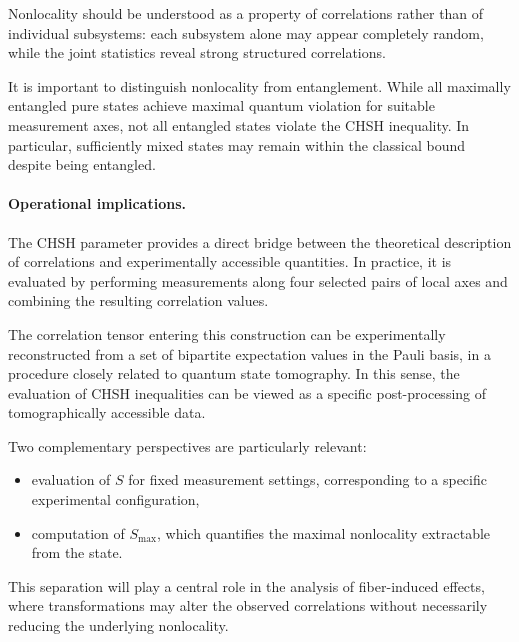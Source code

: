 \medskip

Nonlocality should be understood as a property of correlations rather than of individual subsystems: each subsystem alone may appear completely random, while the joint statistics reveal strong structured correlations.

\medskip

It is important to distinguish nonlocality from entanglement. While all maximally entangled pure states achieve maximal quantum violation for suitable measurement axes, not all entangled states violate the CHSH inequality. In particular, sufficiently mixed states may remain within the classical bound despite being entangled.

\medskip

\paragraph{Operational implications.}

The CHSH parameter provides a direct bridge between the theoretical description of correlations and experimentally accessible quantities. In practice, it is evaluated by performing measurements along four selected pairs of local axes and combining the resulting correlation values.

\medskip

The correlation tensor entering this construction can be experimentally reconstructed from a set of bipartite expectation values in the Pauli basis, in a procedure closely related to quantum state tomography. In this sense, the evaluation of CHSH inequalities can be viewed as a specific post-processing of tomographically accessible data.

\medskip

Two complementary perspectives are particularly relevant:
\begin{itemize}
    \item evaluation of \( S \) for fixed measurement settings, corresponding to a specific experimental configuration,
    \item computation of \( S_{\max} \), which quantifies the maximal nonlocality extractable from the state.
\end{itemize}

\medskip

This separation will play a central role in the analysis of fiber-induced effects, where transformations may alter the observed correlations without necessarily reducing the underlying nonlocality.

